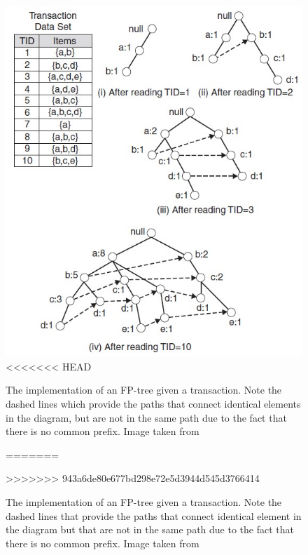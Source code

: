 \documentclass[12pt,%
               a4paper,%
               oneside,openany,%
               titlepage,%
               headinclude,footinclude,%
               BCOR5mm,%
               cleardoublepage=empty,%
               tablecaptionabove,%
               floatperchapter,
               ]{scrreprt}                 %
\begin{document}
\begin{figure}
\begin{center}
\includegraphics[width=\textwidth]{Figures/FP_tree.jpg}
<<<<<<< HEAD
\caption{The implementation of an FP-tree given a transaction. Note the dashed lines which provide the paths that connect identical elements in the diagram, but are not in the same path due to the fact that there is no common prefix.  Image taken from \cite{tan2019introduction} }
=======
\caption{The implementation of an FP-tree given a transaction. Note the dashed lines that provide the paths that connect identical element in the diagram but that are not in the same path due to the fact that there is no common prefix.  Image taken from \cite{tan2019introduction} }
>>>>>>> 943a6de80e677bd298e72e5d3944d545d3766414
\label{FP_tree}
\end{center}
\end{figure}
\end{document}
